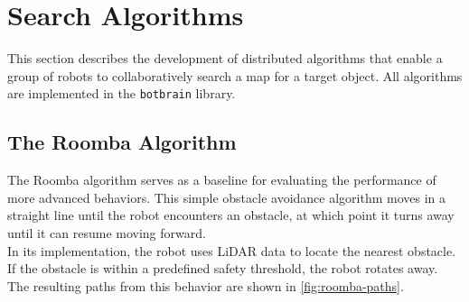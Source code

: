 \section{Search Algorithms}
\label{sec:search-algorithms}

This section describes the development of distributed algorithms that enable a group of robots to collaboratively search a map for a target object. All algorithms are implemented in the \texttt{botbrain} library.

\subsection{The Roomba Algorithm}
The Roomba algorithm serves as a baseline for evaluating the performance of more advanced behaviors. This simple obstacle avoidance algorithm moves in a straight line until the robot encounters an obstacle, at which point it turns away until it can resume moving forward. \\

In its implementation, the robot uses LiDAR data to locate the nearest obstacle. If the obstacle is within a predefined safety threshold, the robot rotates away. The resulting paths from this behavior are shown in \cref{fig:roomba-paths}.

